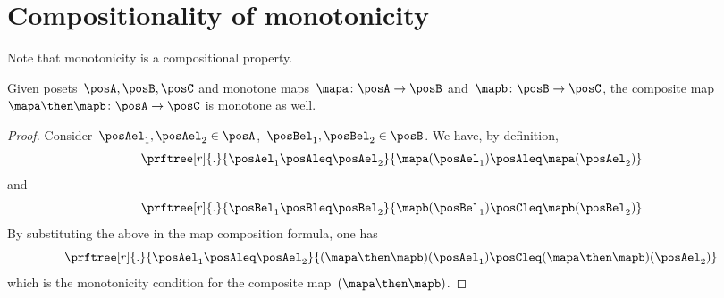 
\section{Compositionality of monotonicity}
Note that monotonicity is a compositional property.
\begin{lemma}
    Given posets~$\posA,\posB,\posC$ and monotone maps~$\mapa\colon \posA \to \posB$ and~$\mapb\colon \posB \to \posC$, the composite map~$\mapa\then \mapb\colon  \posA \to \posC$ is monotone as well.
\end{lemma}
\begin{proof}
    Consider~$\posAel_1,\posAel_2 \in \posA$,~$\posBel_1,\posBel_2\in \posB$.
    We have, by definition,
    \begin{equation*}
        \prftree[r]{.}{\posAel_1\posAleq \posAel_2}{\mapa(\posAel_1)\posAleq \mapa(\posAel_2)}
    \end{equation*}
    and
    \begin{equation*}
        \prftree[r]{.}{\posBel_1\posBleq \posBel_2}{\mapb(\posBel_1)\posCleq \mapb(\posBel_2)}
    \end{equation*}
    By substituting the above in the map composition formula, one has
    \begin{equation}
        \prftree[r]{.}{\posAel_1\posAleq \posAel_2 }{ (\mapa\then \mapb)(\posAel_1) \posCleq (\mapa\then \mapb)(\posAel_2)}
    \end{equation}
    which is the monotonicity condition for the composite map~$(\mapa\then \mapb)$.
\end{proof}
